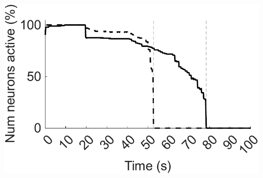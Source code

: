\documentclass[utf8]{FrontiersinHarvard} %
\begin{document}
\begin{subfigure}
\begin{minipage}[b]{0.32\textwidth}
        \includegraphics[width=\linewidth]{AD/Hz_sum}
        \caption{}
        \label{figs:results:AD:Hz_sums}
    \end{minipage}%
\setcounter{figure}{4}
\setcounter{subfigure}{-1}
    \caption{Typical network dynamics with and without resource pool replenishment while removing connections. \textbf{(A)} Input is provided for the first \SI{20}{\second}. Synapses are progressively deleted from \SI{40}{\second} on (red). {\textbf{(B)}} Progressive synaptic loss. {\textbf{(C)}} Firing rates of the network's neurons with replenishment of the resource pool. {\textbf{(D)}} Left axis: Example of \SI{100}{} synapses' weights with resource pool replenishment. Right axis/dashed line: Mean of nonfilopodia synapses' weights. {\textbf{(E)}} Resource pools, $p$, with replenishment of the resource pool. {\textbf{(F)}} Firing rates of the network's neurons without replenishment of the resource pool. {\textbf{(G)}} Left axis: Example of \SI{100}{} synapses' weights without replenishment of the resource pool. Right axis/dashed line: Mean of nonfilopodia synapses' weights. {\textbf{(H)}} Sum of weights as a percentage of the maximum sum of weights. Solid line, with resource replenishment; dashed line, without resource replenishment. {\textbf{(I)}} The number of active neurons as a percentage of the maximum number of active neurons. Solid line, with resource replenishment; dashed line, without resource replenishment. {\textbf{(B)}}, {\textbf{(H)}}, and {\textbf{(I)}} Vertical lines are when all neurons stopped firing either with or without resource replenishment. {\textbf{(D)}} and {\textbf{(G)}} Weights are shown while they exist and the mean of nonfilopodia synapses' weights is shown while neurons are active.}
    \label{figs:results:AD}
\end{subfigure}

\end{document}
